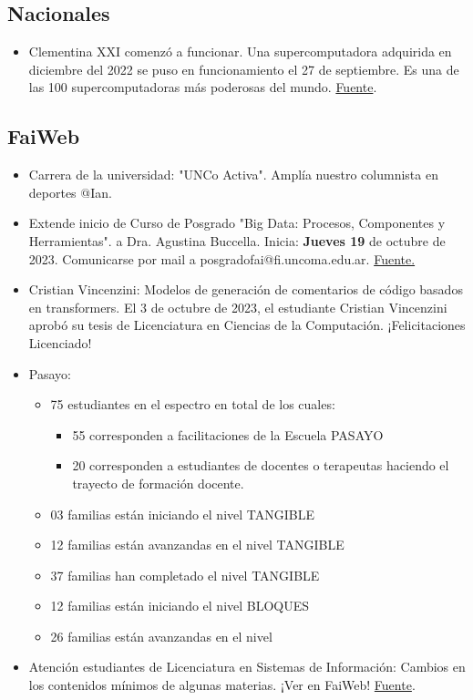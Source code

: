 \documentclass[11pt]{article}
\begin{document}
\subsection{Nacionales}
\label{sec:orgbf55ebc}
\begin{itemize}
\item Clementina XXI comenzó a funcionar. Una supercomputadora adquirida en diciembre del 2022 se puso en funcionamiento el 27 de septiembre. Es una de las 100 supercomputadoras más poderosas del mundo. \href{https://www.pagina12.com.ar/592307-clementina-xxi-la-supercomputadora-argentina-ya-comenzo-a-fu}{Fuente}.
\end{itemize}

\subsection{FaiWeb}
\label{sec:org219428a}
\begin{itemize}
\item Carrera de la universidad: "UNCo Activa". Amplía nuestro columnista en deportes @Ian.
\item Extende inicio de Curso de Posgrado "Big Data: Procesos, Componentes y Herramientas". a Dra. Agustina Buccella. Inicia: \textbf{Jueves 19} de octubre de 2023. Comunicarse por mail a posgradofai@fi.uncoma.edu.ar. \href{https://www.fi.uncoma.edu.ar/index.php/investigacion-y-postgrado/cursos/curso-de-posgrado-big-data-procesos-componentes-y-herramientas/}{Fuente.}
\item Cristian Vincenzini: Modelos de generación de comentarios de código basados en transformers. El 3 de octubre de 2023, el estudiante Cristian Vincenzini aprobó su tesis de Licenciatura en Ciencias de la Computación. ¡Felicitaciones Licenciado!
\item Pasayo:
\begin{itemize}
\item 75 estudiantes en el espectro en total de los cuales: 
\begin{itemize}
\item 55 corresponden a facilitaciones de la Escuela PASAYO
\item 20 corresponden a estudiantes de docentes o terapeutas haciendo el trayecto de formación docente.
\end{itemize}
\item 03 familias están iniciando el nivel TANGIBLE
\item 12 familias están avanzandas en el nivel TANGIBLE
\item 37 familias han completado el nivel TANGIBLE
\item 12 familias están iniciando el nivel BLOQUES
\item 26 familias están avanzandas en el nivel
\end{itemize}
\item Atención estudiantes de Licenciatura en Sistemas de Información: Cambios en los contenidos mínimos de algunas materias. ¡Ver en FaiWeb! \href{https://www.fi.uncoma.edu.ar/index.php/novedades/importante-atencion-estudiantes-de-licenciatura-en-sistemas-de-informacion/}{Fuente}.
\end{itemize}
\end{document}
